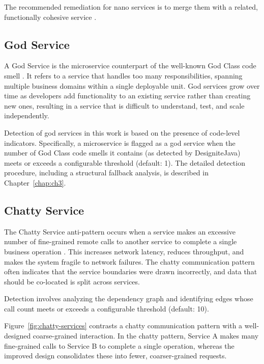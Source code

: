 The recommended remediation for nano services is to merge them with a related, functionally cohesive service \cite{Taibi2018}.

\subsection{God Service}
\label{subsec:god-service}

\par A God Service is the microservice counterpart of the well-known God Class code smell \cite{Fowler1999}. It refers to a service that handles too many responsibilities, spanning multiple business domains within a single deployable unit. God services grow over time as developers add functionality to an existing service rather than creating new ones, resulting in a service that is difficult to understand, test, and scale independently.

Detection of god services in this work is based on the presence of code-level indicators. Specifically, a microservice is flagged as a god service when the number of God Class code smells it contains (as detected by DesigniteJava) meets or exceeds a configurable threshold (default: 1). The detailed detection procedure, including a structural fallback analysis, is described in Chapter~\ref{chap:ch3}.

\subsection{Chatty Service}
\label{subsec:chatty-service}

\par The Chatty Service anti-pattern occurs when a service makes an excessive number of fine-grained remote calls to another service to complete a single business operation \cite{Richardson2018}. This increases network latency, reduces throughput, and makes the system fragile to network failures. The chatty communication pattern often indicates that the service boundaries were drawn incorrectly, and data that should be co-located is split across services.

Detection involves analyzing the dependency graph and identifying edges whose call count meets or exceeds a configurable threshold (default: 10).

Figure~\ref{fig:chatty-services} contrasts a chatty communication pattern with a well-designed coarse-grained interaction. In the chatty pattern, Service A makes many fine-grained calls to Service B to complete a single operation, whereas the improved design consolidates these into fewer, coarser-grained requests.

